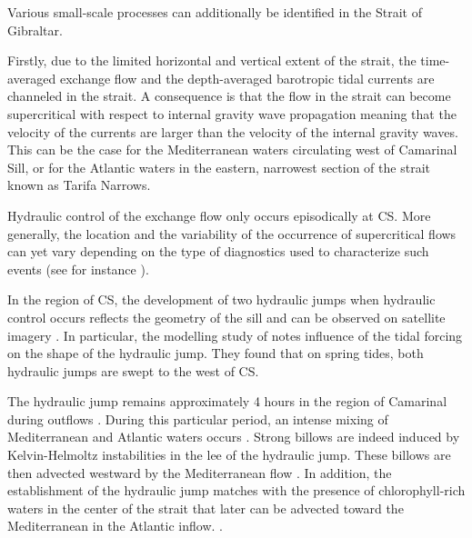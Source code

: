 Various small-scale processes can additionally be identified in the Strait of Gibraltar.

Firstly, due to the limited horizontal and vertical extent of the strait, the time-averaged exchange flow and the depth-averaged barotropic tidal currents are channeled in the strait. A consequence is that the flow in the strait can become supercritical with respect to internal gravity wave propagation meaning that the velocity of the currents are larger than the velocity of the internal gravity waves. \color{red}This can be the case for the Mediterranean waters circulating west of Camarinal Sill, or for the Atlantic waters in the eastern, narrowest section of the strait known as Tarifa Narrows. \color{black}%

Hydraulic control of the exchange flow only occurs episodically at CS. More generally, the location and the variability of the occurrence of supercritical flows can yet vary depending on the type of diagnostics used to characterize such events (see for instance \citet{FA1988,vargas_2006,sannino_2007,sanchez-roman_2012}). 

In the region of CS, the development of two hydraulic jumps when hydraulic control occurs reflects the geometry of the sill and can be observed on satellite imagery \citep{brandt_1996,sanchez-garrido_2011}. In particular, the modelling study of \citet{sanchez-garrido_2011} notes influence of the tidal forcing on the shape of the hydraulic jump. They found that on spring tides, both hydraulic jumps are swept to the west of CS.

The hydraulic jump remains approximately 4 hours in the region of Camarinal during outflows \citep{FA1988,vlasenko_2009}. During this particular period, an intense mixing of Mediterranean and Atlantic waters occurs \citep{wesson_1994,macias_2006,GarciaLafuente2011}. Strong billows are indeed induced by Kelvin-Helmoltz instabilities in the lee of the hydraulic jump. These billows are then advected westward by the Mediterranean flow \citep{wesson_1994}. In addition, the establishment of the hydraulic jump matches with the presence of chlorophyll-rich waters in the center of the strait \color{red}that later can be advected toward the Mediterranean in the Atlantic inflow.\color{black} \citep{bruno_2013}.

